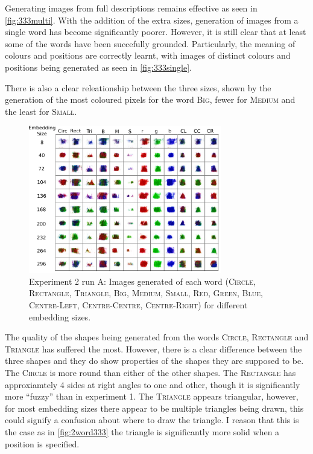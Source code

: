 Generating images from full descriptions remains effective as seen in \autoref{fig:333multi}.
With the addition of the extra sizes, generation of images from a single word has become significantly poorer. However, it is still clear that at least some of the words have been succefully grounded. Particularly, the meaning of colours and positions are correctly learnt, with images of distinct colours and positions being generated as seen in \autoref{fig:333single}. 

There is also a clear releationship between the three sizes, shown by the generation of the most coloured pixels for the word \textsc{Big}, fewer for \textsc{Medium} and the least for \textsc{Small}.

\begin{figure}[h]
\centering
\includegraphics[width=0.75\textwidth]{Figs/shapes/singlelabel333A.png}
\caption{Experiment 2 run A: Images generated of each word (\textsc{Circle, Rectangle, Triangle, Big, Medium, Small, Red, Green, Blue, Centre-Left, Centre-Centre, Centre-Right}) for different embedding sizes.}
\label{fig:333single}
\end{figure} 

The quality of the shapes being generated from the words \textsc{Circle}, \textsc{Rectangle} and \textsc{Triangle} has suffered the most. However, there is a clear difference between the three shapes and they do show properties of the shapes they are supposed to be. The \textsc{Circle} is more round than either of the other shapes. The \textsc{Rectangle} has approxiamtely 4 sides at right angles to one and other, though it is significantly more ``fuzzy'' than in experiment 1. The \textsc{Triangle} appears triangular, however, for most embedding sizes there appear to be multiple triangles being drawn, this could signify a confusion about where to draw the triangle. I reason that this is the case as in \autoref{fig:2word333} the triangle is significantly more solid when a position is specified. 


